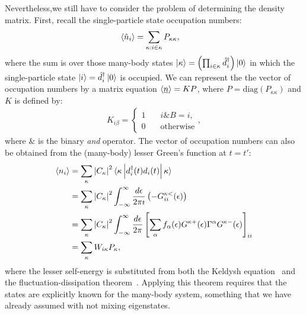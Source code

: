 \documentclass{article}
\begin{document}
\begin{multicols}{2}
        Nevertheless,we still have to consider the problem of determining the density matrix. First, recall the single-particle state occupation numbers:
        \begin{align*}
            \braket{\hat{n}_i} &= \sum_{\kappa: i\in \kappa} P_{\kappa\kappa},
        \end{align*}
        where the sum is over those many-body states $\ket{\kappa}=\left(\prod_{i\in\kappa}\hat{d}_i^\dagger \right)\ket{0}$ in which the single-particle state $\ket{i} = \hat{d}_i^\dagger \ket{0}$ is occupied. We can represent the the vector of occupation numbers by a matrix equation $\braket{\underline{n}} = KP$, where $P=\text{diag}(P_{\kappa\kappa})$ and $K$ is defined by:
        \begin{align}
            K_{i\beta} = \begin{cases} 1 & \quad i\&B=i, \\ 0 & \quad\text{otherwise}\end{cases},
        \label{eq:kmatrix}\end{align}
        where $\&$ is the binary \emph{and} operator. 
        The vector of occupation numbers can also be obtained from the (many-body) lesser Green's function at $t=t'$:
        \begin{align} 
            \braket{n_i} &= \sum_{\kappa} \left|C_\kappa\right|^2 \braket{\kappa \left| d_i^\dagger (t) d_i (t) \right| \kappa} \nonumber\\   
            &= \sum_{\kappa} \left|C_\kappa\right|^2 \int^\infty_{-\infty} \frac{d\epsilon}{2\pi\imath} \left(-G^{\kappa<}_{ii} (\epsilon)\right) \nonumber\\
            &= \sum_{\kappa} \left|C_\kappa\right|^2 \int^\infty_{-\infty} \frac{d\epsilon}{2\pi} \left[ \sum_\alpha f_\alpha(\epsilon) G^{\kappa+}(\epsilon) \Gamma^\alpha G^{\kappa-}(\epsilon)\right]_{ii} \nonumber\\ 
            &= \sum_\kappa W_{i\kappa} P_\kappa, \label{eq:wmatrix}
        \end{align}
        where the lesser self-energy is substituted from both the Keldysh equation~\cite{diventra} and the fluctuation-dissipation theorem~\cite{haugjauho}. Applying this theorem requires that the states are explicitly known for the many-body system, something that we have already assumed with not mixing eigenstates.       
         

\end{multicols}
\end{document}
